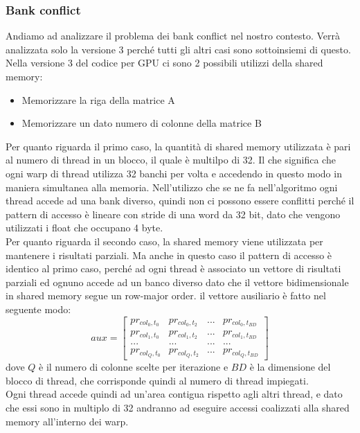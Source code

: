 \documentclass[conference]{IEEEtran}
\begin{document}
\subsubsection{Bank conflict}
Andiamo ad analizzare il problema dei bank conflict nel nostro contesto. Verrà analizzata solo la versione 3 perché tutti gli altri casi sono sottoinsiemi di questo.\\
Nella versione 3 del codice per GPU ci sono 2 possibili utilizzi della shared memory: 
\begin{itemize}
    \item Memorizzare la riga della matrice A 
    \item Memorizzare un dato numero di colonne della matrice B
\end{itemize}
Per quanto riguarda il primo caso, la quantità di shared memory utilizzata è pari al numero di thread in un blocco, il quale è multilpo di 32. Il che significa che ogni warp di thread utilizza 32 banchi per volta e accedendo in questo modo in maniera simultanea alla memoria. Nell'utilizzo che se ne fa nell'algoritmo ogni thread accede ad una bank diverso, quindi non ci possono essere conflitti perché il pattern di accesso è lineare con stride di una word da 32 bit, dato che vengono utilizzati i float che occupano 4 byte.\\
Per quanto riguarda il secondo caso, la shared memory viene utilizzata per mantenere i risultati parziali. Ma anche in questo caso il pattern di accesso è identico al primo caso, perché ad ogni thread è associato un vettore di risultati parziali ed ognuno accede ad un banco diverso dato che il vettore bidimensionale in shared memory segue un row-major order. il vettore ausiliario è fatto nel seguente modo:
\[
aux = \left[
\begin{matrix}
pr_{col_0, t_0} & pr_{col_0, t_2} & ... & pr_{col_0, t_{BD}} \\
pr_{col_1, t_0} & pr_{col_1, t_2} & ... & pr_{col_1, t_{BD}} \\
... & ... & ... & ... \\
pr_{col_{Q}, t_0} & pr_{col_{Q}, t_2} & ... & pr_{col_{Q}, t_{BD}}
\end{matrix}\right]
\]
dove $Q$ è il numero di colonne scelte per iterazione e $BD$ è la dimensione del blocco di thread, che corrisponde quindi al numero di thread impiegati.\\
Ogni thread accede quindi ad un'area contigua rispetto agli altri thread, e dato che essi sono in multiplo di 32 andranno ad eseguire accessi coalizzati alla shared memory all'interno dei warp.
\end{document}
